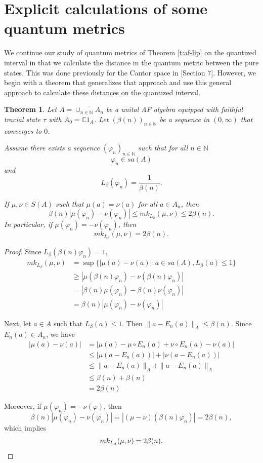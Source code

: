 \documentclass[]{amsart}
\newcommand{\ninn}{n \in \N}
\newcommand{\vhi}{{\varphi}}
\newcommand{\N}{{\mathds{N}}}
\newcommand{\C}{{\mathds{C}}}
\theoremstyle{plain}
\newtheorem{theorem}{Theorem}[section]
\theoremstyle{definition}
\theoremstyle{remark}
\renewcommand{\geq}{\geqslant}
\renewcommand{\leq}{\leqslant}
\numberwithin{equation}{section}
\begin{document}
     
    

    
\section{Explicit calculations of some quantum metrics}\label{s:natural-numbers}
We continue our study of quantum metrics of Theorem \ref{t:af-lip} on the quantized interval in that we calculate the distance in the quantum metric between the pure states. This was done previously for the Cantor space in [Section 7]\cite{Aguilar-Latremoliere15}. However, we begin with a theorem that generalizes that approach and use this general approach to calculate these distances on the quantized interval.
\begin{theorem}\label{t:state-calc}
Let $A=\overline{\cup_{\ninn}A_n}$ be a unital AF algebra equipped with faithful tracial state $\tau$ with $A_0=\C1_A$. Let $(\beta(n))_{n \in \N}$ be a sequence in $(0,\infty)$ that converges to $0$.   


Assume there exists a sequence $(\vhi_n)_{\ninn}$ such that for all $\ninn$
\[
\vhi_n \in sa(A)
\]
and
\[
L_\beta(\vhi_n)=\frac{1}{\beta(n)}.
\]



If $\mu, \nu \in S(A)$ such that $\mu(a)=\nu(a)$ for all $a \in A_n$, then 
\[
\beta(n)|\mu(\vhi_n)-\nu(\vhi_n)|\leq mk_{L_\beta}(\mu, \nu) \leq 2 \beta(n).
\]
In particular, if $\mu(\vhi_n)=-\nu(\vhi_n)$, then 
\[
mk_{L_\beta}(\mu, \nu) = 2 \beta(n).
\]


\end{theorem}
\begin{proof}
Since $L_\beta(\beta(n)\vhi_n)=1$, 
    \begin{align*}
        mk_{L_\beta}(\mu, \nu) &= \sup \{|\mu(a)-\nu(a)| : a\in sa(A), L_\beta(a)\leq 1\}\\
       & \geq |\mu(\beta(n)\vhi_n) - \nu(\beta(n)\vhi_n)|\\
        &=|\beta(n)\mu(\vhi_n) - \beta(n)\nu(\vhi_n)| \\
       & = \beta(n)|\mu(\vhi_n)-\nu(\vhi_n)|
    \end{align*}

    Next, let $a \in A$ such that $L_\beta(a) \leq 1$. Then $\|a-E_n(a)\|_A \leq \beta(n)$. Since $E_n(a) \in A_n$, we have
    \begin{align*}
        |\mu(a)-\nu(a)| &= | \mu(a)- \mu \circ E_n(a) + \nu \circ E_n(a) - \nu(a) |\\
        &\leq |\mu(a-E_n(a))| +|\nu(a-E_n(a))| \\
        &\leq \|a-E_n(a)\|_A + \|a-E_n(a)\|_A\\
        &\leq \beta(n) + \beta(n)\\
        &= 2\beta(n)
    \end{align*} 

    Moreover, if $ \mu(\vhi_n)=-\nu(\vhi)$, then 
    \[
 \beta(n)|\mu(\vhi_n)-\nu(\vhi_n)|=|(\mu-\nu)(\beta(n)\vhi_n)|=2\beta(n),
\]
which implies
\[
mk_{L_\beta}(\mu, \nu) = 2 \beta(n) . \qedhere
\]
\end{proof}
\end{document}
